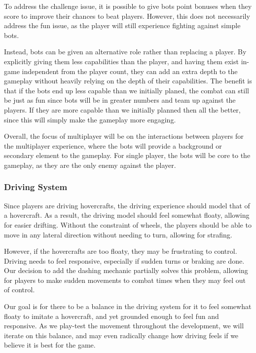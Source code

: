 \documentclass{article}
\theoremstyle{definition}
\begin{document}
To address the challenge issue, it is possible to give bots point bonuses when
they score to improve their chances to beat players. However, this does not
necessarily address the fun issue, as the player will still experience fighting
against simple bots.

Instead, bots can be given an alternative role rather than replacing a player.
By explicitly giving them less capabilities than the player, and having them
exist in-game independent from the player count, they can add an extra depth to
the gameplay without heavily relying on the depth of their capabilities. The
benefit is that if the bots end up less capable than we initially planed, the
combat can still be just as fun since bots will be in greater numbers and team
up against the players. If they are more capable than we initially planned then
all the better, since this will simply make the gameplay more engaging.

Overall, the focus of multiplayer will be on the interactions between players
for the multiplayer experience, where the bots will provide a background or
secondary element to the gameplay. For single player, the bots will be core to
the gameplay, as they are the only enemy against the player.

\subsubsection{Driving System}

Since players are driving hovercrafts, the driving experience should model
that of a hovercraft. As a result, the driving model should feel somewhat
floaty, allowing for easier drifting. Without the constraint of wheels, the
players should be able to move in any lateral direction without needing to
turn, allowing for strafing.

However, if the hovercrafts are too floaty, they may be frustrating to control.
Driving needs to feel responsive, especially if sudden turns or braking are
done. Our decision to add the dashing mechanic partially solves this problem,
allowing for players to make sudden movements to combat times when they may
feel out of control.

Our goal is for there to be a balance in the driving system for it to feel
somewhat floaty to imitate a hovercraft, and yet grounded enough to feel fun
and responsive. As we play-test the movement throughout the development, we
will iterate on this balance, and may even radically change how driving feels
if we believe it is best for the game.
\end{document}

